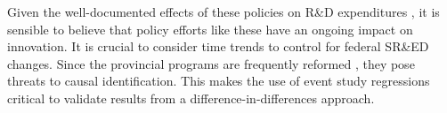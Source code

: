 \documentclass[../main.tex]{subfiles}
\begin{document}
Given the well-documented effects of these policies on R\&D expenditures \parencite{mansfield_switzer85b, agrawal_etal20, becker15}, it is sensible to believe that policy efforts like these have an ongoing impact on innovation. It is crucial to consider time trends to control for federal SR\&ED changes. Since the provincial programs are frequently reformed \parencite{mckenzie05}, they pose threats to causal identification. This makes the use of event study regressions critical to validate results from a difference-in-differences approach.
\end{document}
